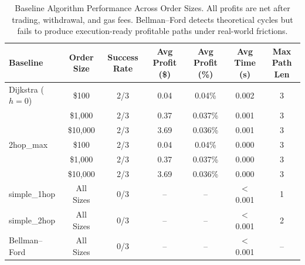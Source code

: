 \begin{table}[t]
\centering
\small
\setlength{\tabcolsep}{6pt}
\caption{Baseline Algorithm Performance Across Order Sizes. 
All profits are net after trading, withdrawal, and gas fees. 
Bellman--Ford detects theoretical cycles but fails to produce execution-ready profitable paths under real-world frictions.}
\label{tab:baseline-performance}
\begin{tabular}{lcccccc}
\toprule
\textbf{Baseline} 
& \textbf{Order Size} 
& \textbf{Success Rate} 
& \textbf{Avg Profit (\$)} 
& \textbf{Avg Profit (\%)} 
& \textbf{Avg Time (s)} 
& \textbf{Max Path Len} \\
\midrule

Dijkstra ($h{=}0$)
& \$100     & 2/3 & 0.04  & 0.04\%  & 0.002 & 3 \\
& \$1,000   & 2/3 & 0.37  & 0.037\% & 0.001 & 3 \\
& \$10,000  & 2/3 & 3.69  & 0.036\% & 0.001 & 3 \\
\midrule

2hop\_max
& \$100     & 2/3 & 0.04  & 0.04\%  & 0.000 & 3 \\
& \$1,000   & 2/3 & 0.37  & 0.037\% & 0.000 & 3 \\
& \$10,000  & 2/3 & 3.69  & 0.036\% & 0.000 & 3 \\
\midrule

simple\_1hop
& All Sizes & 0/3 & -- & -- & $<$0.001 & 1 \\
\midrule

simple\_2hop
& All Sizes & 0/3 & -- & -- & $<$0.001 & 2 \\
\midrule

Bellman--Ford
& All Sizes & 0/3 & -- & -- & $<$0.001 & -- \\

\bottomrule
\end{tabular}
\end{table}